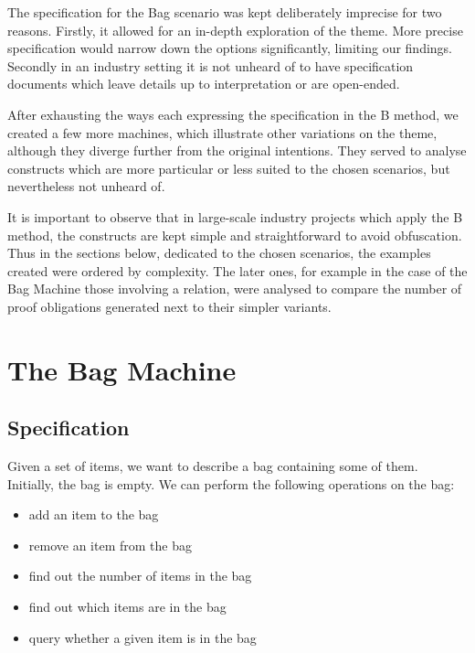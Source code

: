 \documentclass[12pt,journal,duplex]{IEEEtran}
\begin{document}
	The specification for the Bag scenario was kept deliberately imprecise for two reasons. Firstly, it allowed for an in-depth exploration of the theme. More precise specification would narrow down the options significantly, limiting our findings. Secondly in an industry setting it is not unheard of to have specification documents which leave details up to interpretation or are open-ended.

	After exhausting the ways each expressing the specification in the B method, we created a few more machines, which illustrate other variations on the theme, although they diverge further from the original intentions. They served to analyse constructs which are more particular or less suited to the chosen scenarios, but nevertheless not unheard of.

	It is important to observe that in large-scale industry projects which apply the B method, the constructs are kept simple and straightforward to avoid obfuscation. Thus in the sections below, dedicated to the chosen scenarios, the examples created were ordered by complexity. The later ones, for example in the case of the Bag Machine those involving a relation, were analysed to compare the number of proof obligations generated next to their simpler variants.

	\section{The Bag Machine}
	\subsection{Specification}
	Given a set of items, we want to describe a bag containing some of them. Initially, the bag is empty. We can perform the following operations on the bag:
	\begin{itemize}
		\item add an item to the bag
		\item remove an item from the bag
		\item find out the number of items in the bag
		\item find out which items are in the bag
		\item query whether a given item is in the bag
	\end{itemize}
\end{document}

